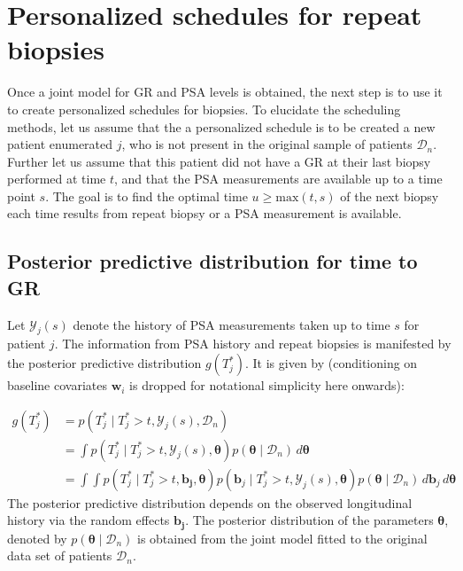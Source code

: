 
\section{Personalized schedules for repeat biopsies}
\label{sec : pers_sched_approaches}
Once a joint model for GR and PSA levels is obtained, the next step is to use it to create personalized schedules for biopsies. To elucidate the scheduling methods, let us assume that the a personalized schedule is to be created a new patient enumerated $j$, who is not present in the original sample of patients $\mathcal{D}_n$. Further let us assume that this patient did not have a GR at their last biopsy performed at time $t$, and that the PSA measurements are available up to a time point $s$. The goal is to find the optimal time $u \geq \text{max}(t,s)$ of the next biopsy each time results from repeat biopsy or a PSA measurement is available. 

\subsection{Posterior predictive distribution for time to GR}
\label{subsec : ppd_time_to_GR}
Let $\mathcal{Y}_j(s)$ denote the history of PSA measurements taken up to time $s$ for patient $j$. The information from PSA history and repeat biopsies is manifested by the posterior predictive distribution $g(T^*_j)$. It is given by (conditioning on baseline covariates $\boldsymbol{w}_i$ is dropped for notational simplicity here onwards):

\begin{equation}
\label{eq : dyn_dist_fail_time}
\begin{split}
g(T^*_j) &= p(T^*_j \mid T^*_j > t, \mathcal{Y}_j(s), \mathcal{D}_n)\\
&= \int p(T^*_j \mid T^*_j > t, \mathcal{Y}_j(s), \boldsymbol{\theta}) p(\boldsymbol{\theta} \mid \mathcal{D}_n) \,d\boldsymbol{\theta}\\
&= \int \int p(T^*_j \mid T^*_j > t, \boldsymbol{b_j}, \boldsymbol{\theta}) p(\boldsymbol{b}_j \mid T^*_j>t, \mathcal{Y}_j(s), \boldsymbol{\theta})p(\boldsymbol{\theta} \mid \mathcal{D}_n) \,d\boldsymbol{b}_j \,d\boldsymbol{\theta}
\end{split}
\end{equation}
The posterior predictive distribution depends on the observed longitudinal history via the random effects $\boldsymbol{b_j}$. The posterior distribution of the parameters $\boldsymbol{\theta}$, denoted by $p(\boldsymbol{\theta} \mid \mathcal{D}_n)$ is obtained from the joint model fitted to the original data set of patients $\mathcal{D}_n$.\\

